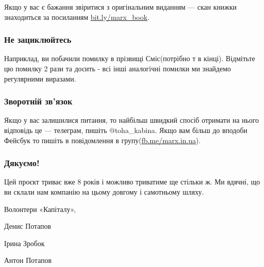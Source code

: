 \documentclass{kapital}
\begin{document}
{  \noindent{}Якщо у вас є бажання звіритися з оригінальним виданням — 
  скан книжки знаходиться за посиланням \underline{bit.ly/marx\_book}.

  \subsubsection*{Не зациклюйтесь}

  Наприклад, ви побачили помилку в прізвищі Сміс(потрібно т в кінці).
  Відмітьте цю помилку 2 рази та досить - всі інші аналогічні помилки ми знайдемо
  регулярними виразами.

  \subsubsection*{Зворотній зв'язок}


  Якщо у вас залишилися питання, то найбільш швидкий спосіб отримати 
  на нього відповідь це — телеграм, пишіть @toha\_kabina. Якщо вам 
  більш до вподоби Фейсбук то пишіть в повідомлення в 
  групу(\underline{fb.me/marx.in.ua}).

  \subsubsection*{Дякуємо!}

  Цей проєкт триває вже 8 років і можливо триватиме ще стільки ж. Ми вдячні, що
  ви склали нам компанію на цьому довгому і самотньому шляху.
  
  \bigskip{}

  \noindent{}Волонтери «Капіталу»,

  \medskip{}

  \noindent{}Денис Потапов

  \noindent{}Ірина Зробок

  \noindent{}Антон Потапов
}
\end{document}
